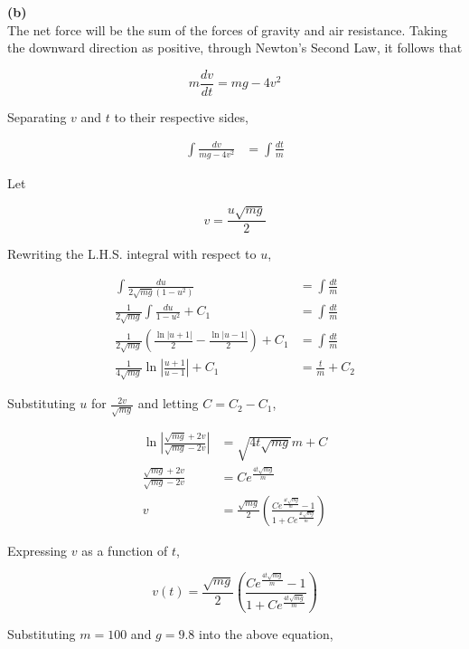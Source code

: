 \documentclass{article}
\begin{document}
    \textbf{(b)} \\
    The net force will be the sum of the forces of gravity and air resistance. Taking the downward direction as positive, through Newton's Second Law, it follows that

    \[
        m\frac{dv}{dt} = mg - 4v^2
    \]

    Separating $v$ and $t$ to their respective sides,

    \begin{align*}
        \int \frac{dv}{mg-4v^2} &= \int \frac{dt}{m}
    \end{align*}

    Let

    \[
        v = \frac{u\sqrt{mg}}{2}
    \]

    Rewriting the L.H.S. integral with respect to $u$,

    \begin{align*}
        \int \frac{du}{2\sqrt{mg}\left(1-u^2\right)}  &= \int \frac{dt}{m} \\
        \frac{1}{2\sqrt{mg}}\int\frac{du}{1-u^2}  + C_1   &= \int \frac{dt}{m} \\
        \frac{1}{2\sqrt{mg}}\left(\frac{\ln{|u+1|}}{2}-\frac{\ln{|u-1|}}{2}\right) + C_1 &= \int \frac{dt}{m} \\
        \frac{1}{4\sqrt{mg}}\ln{\left|\frac{u+1}{u-1}\right|}               + C_1        &= \frac{t}{m} + C_2
    \end{align*}

    Substituting $u$ for $\frac{2v}{\sqrt{mg}}$ and letting $C=C_2 - C_1$,

    \begin{align*}
        \ln{\left|\frac{\sqrt{mg}+2v}{\sqrt{mg}-2v}\right|} &= \sqrt{4t\sqrt{mg}}{m} + C \\
        \frac{\sqrt{mg}+2v}{\sqrt{mg}-2v}                   &= Ce^{\frac{4t\sqrt{mg}}{m}} \\
        v                                                   &= \frac{\sqrt{mg}}{2}\left(\frac{Ce^{\frac{4t\sqrt{mg}}{m}}-1}{1+Ce^{\frac{4t\sqrt{mg}}{m}}}\right)
    \end{align*}

    Expressing $v$ as a function of $t$,

    \[
        v(t) = \frac{\sqrt{mg}}{2}\left(\frac{Ce^{\frac{4t\sqrt{mg}}{m}}-1}{1+Ce^{\frac{4t\sqrt{mg}}{m}}}\right)
    \]

    Substituting $m=100$ and $g=9.8$ into the above equation,
\end{document}
